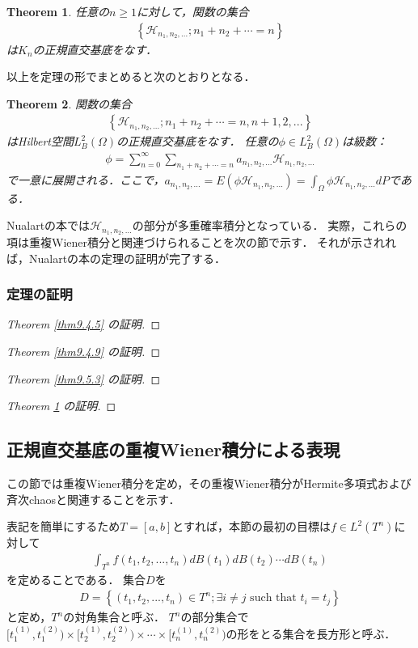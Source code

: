 \documentclass[a4paper,10pt]{jsarticle}
\theoremstyle{plain}
\newtheorem{theorem}{Theorem}
\newcommand{\eq}[1]{\begin{align}#1\end{align}}
\begin{document}
\begin{theorem}\label{thm9.5.4}%
任意の$n\ge1$に対して，関数の集合
\eq{\left\{\mathcal{H}_{n_1,n_2,...};n_1+n_2+\cdots=n\right\}}
は$K_n$の正規直交基底をなす．
\end{theorem}

以上を定理の形でまとめると次のとおりとなる．
\begin{theorem}\label{thm9.5.7}%
関数の集合
\eq{\left\{\mathcal{H}_{n_1,n_2,...};n_1+n_2+\cdots=n,n+1,2,...\right\}}
はHilbert空間$L^2_B(\Omega)$の正規直交基底をなす．
任意の$\phi\in L^2_B(\Omega)$は級数：
\eq{\phi=\sum_{n=0}^\infty\sum_{n_1+n_2+\cdots=n}a_{n_1,n_2,...}\mathcal{H}_{n_1,n_2,...}}
で一意に展開される．ここで，$a_{n_1,n_2,...}=E(\phi\mathcal{H}_{n_1,n_2,...})=\int_\Omega\phi\mathcal{H}_{n_1,n_2,...}dP$である．
\end{theorem}
Nualartの本では$\mathcal{H}_{n_1,n_2,...}$の部分が多重確率積分となっている．
実際，これらの項は重複Wiener積分と関連づけられることを次の節で示す．
それが示されれば，Nualartの本の定理の証明が完了する．

\subsubsection{定理の証明}
\begin{proof}[Theorem \ref{thm9.4.5} の証明]
\end{proof}
\begin{proof}[Theorem \ref{thm9.4.9} の証明]
\end{proof}
\begin{proof}[Theorem \ref{thm9.5.3} の証明]
\end{proof}
\begin{proof}[Theorem \ref{thm9.5.4} の証明]
\end{proof}
\subsection{正規直交基底の重複Wiener積分による表現}
この節では重複Wiener積分を定め，その重複Wiener積分がHermite多項式および斉次chaosと関連することを示す．

表記を簡単にするため$T=[a,b]$とすれば，本節の最初の目標は$f\in L^2(T^n)$に対して
\eq{\int_{T^n}f(t_1,t_2,...,t_n)dB(t_1)dB(t_2)\cdots dB(t_n)}
を定めることである．
集合$D$を
\eq{D=\left\{(t_1,t_2,...,t_n)\in T^n;\exists i\neq j\text{ such that }t_i=t_j\right\}}
と定め，$T^n$の対角集合と呼ぶ．
$T^n$の部分集合で$[t_1^{(1)},t_1^{(2)})\times[t_2^{(1)},t_2^{(2)})\times\cdots\times[t_n^{(1)},t_n^{(2)})$の形をとる集合を長方形と呼ぶ．
\end{document}
